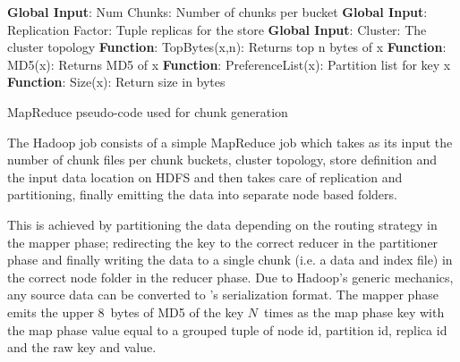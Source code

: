 \begin{algorithm}
\scriptsize
\DontPrintSemicolon
{}

{\bf Global Input}: Num Chunks: Number of chunks per bucket\;
{\bf Global Input}: Replication Factor: Tuple replicas for the store\;
{\bf Global Input}: Cluster: The cluster topology\;
{\bf Function}: TopBytes(x,n): Returns top n bytes of x\;
{\bf Function}: MD5(x): Returns MD5 of x\;
{\bf Function}: PreferenceList(x): Partition list for key x\;
{\bf Function}: Size(x): Return size in bytes\;

\BlankLine
\BlankLine
{}

\BlankLine
{}


\BlankLine
{} 
\BlankLine
\caption{MapReduce pseudo-code used for chunk generation}
\label{fig:mapreduce-chunk-generation}
\end{algorithm}

The Hadoop job consists of a simple MapReduce job which takes as its
input the number of chunk files per chunk buckets, cluster topology, 
store definition and the input data location on HDFS and then 
takes care of replication and partitioning, finally emitting the 
data into separate node based folders. 

This is achieved by partitioning the data depending on the routing
strategy in the mapper phase; redirecting the key to the correct reducer 
in the partitioner phase and finally writing the data to a single
chunk (i.e. a data and index file) in the correct node folder in the
reducer phase. Due to Hadoop's generic  mechanics, any source data
can be converted to \projectname{}'s serialization format. The mapper
phase emits the upper 8~bytes of MD5 of the \projectname{} key
$N$~times as the map phase key with the map phase value equal to a
grouped tuple of node id, partition id, replica id and the raw
\projectname{} key and value. 

